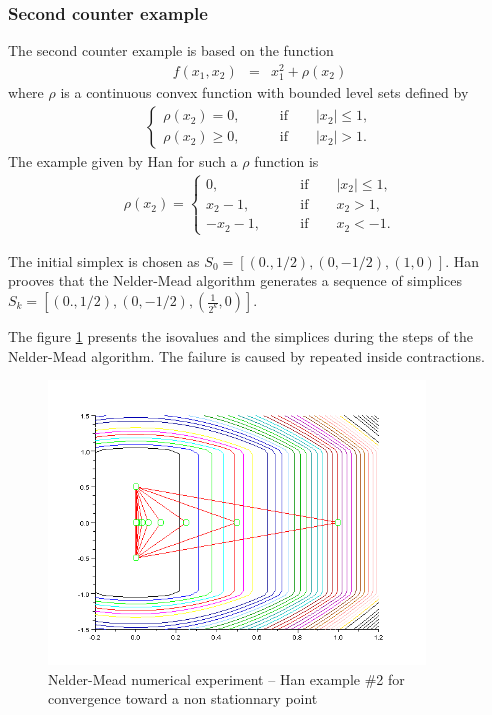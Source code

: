 \subsubsection{Second counter example}

The second counter example is based on the function 
\begin{eqnarray}
\label{han-function2}
f(x_1,x_2) &=& x_1^2 + \rho(x_2)
\end{eqnarray}
where $\rho$ is a continuous convex function with bounded level
sets defined by
\begin{eqnarray}
\label{han-function2-rho}
\left\{
\begin{array}{ll}
\rho(x_2) =0, &\qquad \textrm{if} \qquad |x_2|\leq 1, \\
\rho(x_2)\geq 0, &\qquad \textrm{if} \qquad |x_2|> 1.
\end{array}
\right.
\end{eqnarray}
The example given by Han for such a $\rho$ function is 
\begin{eqnarray}
\label{han-function2-rho2}
\rho(x_2) =
\left\{
\begin{array}{ll}
0, &\qquad \textrm{if} \qquad |x_2|\leq 1, \\
x_2 - 1, &\qquad \textrm{if} \qquad x_2> 1, \\
-x_2 - 1, &\qquad \textrm{if} \qquad x_2 < -1.
\end{array}
\right.
\end{eqnarray}

The initial simplex is chosen as $S_0 = [(0.,1/2),(0,-1/2),(1,0)]$.
Han prooves that the Nelder-Mead algorithm generates a sequence of simplices
$S_k = [(0.,1/2),(0,-1/2),(\frac{1}{2^k},0)]$.

The figure \ref{fig-nm-numexp-han2} presents the isovalues and the 
simplices during the steps of the Nelder-Mead algorithm.
The failure is caused by repeated inside contractions.

\begin{figure}
\begin{center}
\includegraphics[width=10cm]{neldermeadmethod/han2-history-simplex.png}
\end{center}
\caption{Nelder-Mead numerical experiment -- Han example \#2 for convergence toward
a non stationnary point}
\label{fig-nm-numexp-han2}
\end{figure}

